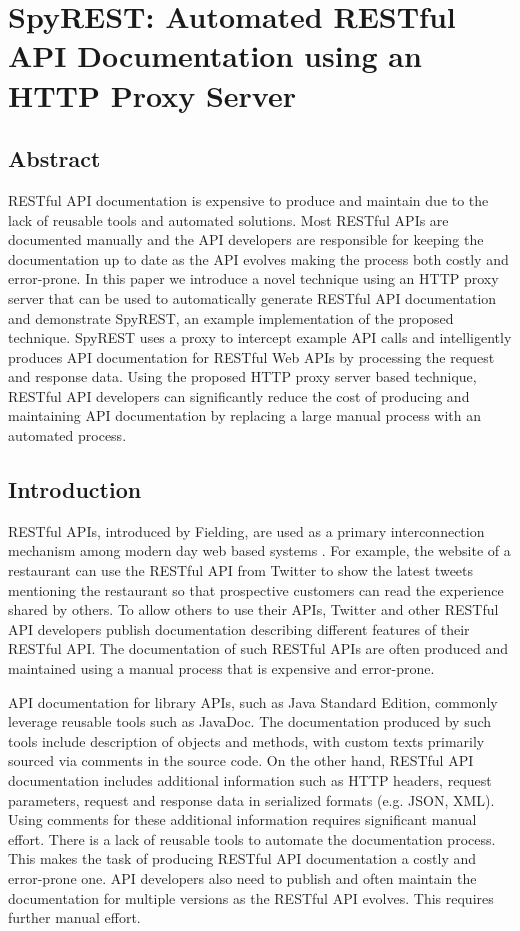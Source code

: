 \chapter{SpyREST: Automated RESTful API Documentation using an HTTP Proxy Server}
\label{chapter:spy_rest}


\section{Abstract}
RESTful API documentation is expensive to produce and maintain due to the lack of reusable tools and automated solutions. Most RESTful APIs are documented manually and the API developers are responsible for keeping the documentation up to date as the API evolves making the process both costly and error-prone. In this paper we introduce a novel technique using an HTTP proxy server that can be used to automatically generate RESTful API documentation and demonstrate SpyREST, an example implementation of the proposed technique. SpyREST uses a proxy to intercept example API calls and intelligently produces API documentation for RESTful Web APIs by processing the request and response data. Using the proposed HTTP proxy server based technique, RESTful API developers can significantly reduce the cost of producing and maintaining API documentation by replacing a large manual process with an automated process.


\section{Introduction}
RESTful APIs, introduced by Fielding, are used as a primary interconnection mechanism among modern day web based systems \cite{Fielding_rest}. For example, the website of a restaurant can use the RESTful API from Twitter to show the latest tweets mentioning the restaurant so that prospective customers can read the experience shared by others. To allow others to use their APIs, Twitter and other RESTful API developers publish documentation describing different features of their RESTful API. The documentation of such RESTful APIs are often produced and maintained using a manual process that is expensive and error-prone.

API documentation for library APIs, such as Java Standard Edition, commonly leverage reusable tools such as JavaDoc. The documentation produced by such tools include description of objects and methods, with custom texts primarily sourced via comments in the source code. On the other hand, RESTful API documentation includes additional information such as HTTP headers, request parameters, request and response data in serialized formats (e.g. JSON, XML). Using comments for these additional information requires significant manual effort. There is a lack of reusable tools to automate the documentation process. This makes the task of producing RESTful API documentation a costly and error-prone one. API developers also need to publish and often maintain the documentation for multiple versions as the RESTful API evolves. This requires further manual effort.


